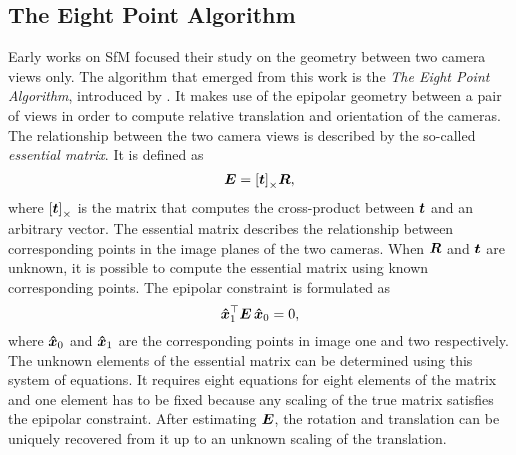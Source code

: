 		\subsection{The Eight Point Algorithm}
			Early works on SfM focused their study on the geometry between two camera views only.
			The algorithm that emerged from this work is the \emph{The Eight Point Algorithm}, introduced by \cite{longuet1981}.
			It makes use of the epipolar geometry between a pair of views in order to compute relative translation and orientation of the cameras.
			The relationship between the two camera views is described by the so-called \emph{essential matrix}.
			It is defined as 
			\begin{equation}\label{eq:essential_matrix}
				\bm{E} = \left[ \bm{t} \right]_\times \! \bm{R},
			\end{equation}
			where $\left[ \bm{t} \right]_\times$ is the matrix that computes the cross-product between $\bm{t}$ and an arbitrary vector.
			The essential matrix describes the relationship between corresponding points in the image planes of the two cameras.
			When $\bm{R}$ and $\bm{t}$ are unknown, it is possible to compute the essential matrix using known corresponding points.
			The epipolar constraint is formulated as 
			\begin{equation}\label{eq:epipolar_constraint}
				\bm{\hat{x}}_1^\top \bm{E} \, \bm{\hat{x}}_0 = 0,
			\end{equation}
			where $\bm{\hat{x}}_0$ and $\bm{\hat{x}}_1$ are the corresponding points in image one and two respectively.
			The unknown elements of the essential matrix can be determined using this system of equations.
			It requires eight equations for eight elements of the matrix and one element has to be fixed because any scaling of the true matrix satisfies the epipolar constraint.
			After estimating $\bm{E}$, the rotation and translation can be uniquely recovered from it up to an unknown scaling of the translation.
			
